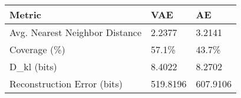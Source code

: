 \begin{tabular}{lll}
\toprule
Metric & VAE & AE \\
\midrule
Avg. Nearest Neighbor Distance & 2.2377 & 3.2141 \\
Coverage (\%) & 57.1\% & 43.7\% \\
D\_kl (bits) & 8.4022 & 8.2702 \\
Reconstruction Error (bits) & 519.8196 & 607.9106 \\
\bottomrule
\end{tabular}
